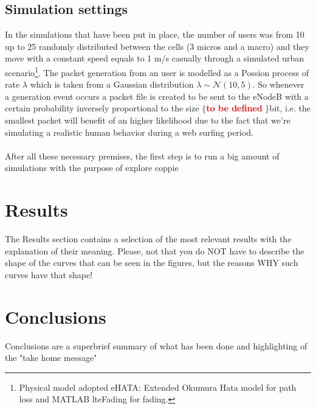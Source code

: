 \documentclass[conference,10pt]{IEEEtran}
\begin{document}
\subsection{Simulation settings}
In the simulations that have been put in place, the number of users was from 10 up to 25 randomly distributed between the cells (3 micros and a macro) and they move with a constant speed equals to 1 m/s casually through a simulated urban scenario\footnote{Physical model adopted eHATA: Extended Okumura Hata model for path loss and MATLAB lteFading for fading.}. The packet generation from an user is modelled as a Possion process of rate $\lambda$ which is taken from a Gaussian distribution $\lambda \sim \mathcal{N}(10,5)$. So whenever a generation event occurs a packet file is created to be sent to the eNodeB with a certain probability inversely proportional to the size $\lbrace$\textcolor{red}{\textbf{to be defined}} $\rbrace$bit, i.e. the smallest packet will benefit of an higher likelihood due to the fact that we're simulating a realistic human behavior during a web surfing period.\\
\\
After all these necessary premises, the first step is to run a big amount of simulations with the purpose of explore coppie        
\section{Results}\label{sec:res}
The Results section contains a selection of the most relevant results with the explanation of their meaning. Please, not that you do NOT have to describe the shape of the curves that can be seen in the figures, but the reasons WHY such curves have that shape!
\section{Conclusions}\label{sec:conclusion}
Conclusions are a superbrief summary of what has been done and highlighting of the "take home message"
\newpage
\nocite{*}


\end{document}
